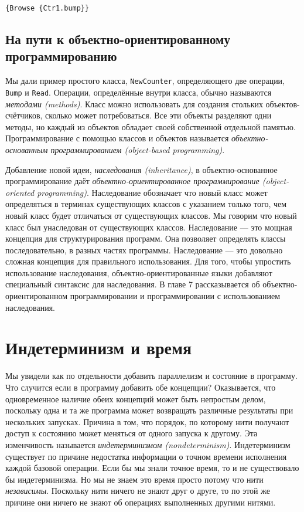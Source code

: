 \begin{lstlisting}
{Browse {Ctr1.bump}}
\end{lstlisting}

\subsection{На пути к объектно-ориентированному программированию}

Мы дали пример простого класса, \lstinline|NewCounter|, определяющего две операции, \lstinline|Bump| и \lstinline|Read|. Операции, определённые внутри класса, обычно называются \emph{методами (methods)}. Класс можно использовать для создания стольких объектов-счётчиков, сколько может потребоваться. Все эти объекты разделяют одни методы, но каждый из объектов обладает своей собственной отдельной памятью. Программирование с помощью классов и объектов называется \emph{объектно-основанным программированием (object-based programming)}.

Добавление новой идеи, \emph{наследования (inheritance)}, в объектно-ос\-но\-ван\-ное программирование даёт \emph{объектно-ориентированное программирование (object-oriented programming)}. Наследование обозначает что новый класс может определяться в терминах существующих классов с указанием только того, чем новый класс будет отличаться от существующих классов. Мы говорим что новый класс был унаследован от существующих классов. Наследование --- это мощная концепция для структурирования программ. Она позволяет определять классы последовательно, в разных частях программы. Наследование --- это довольно сложная концепция для правильного использования. Для того, чтобы упростить использование наследования, объектно-ориентированные языки добавляют специальный синтаксис для наследования. В главе 7 рассказывается об объектно-ориентированном программировании и программировании с использованием наследования.

\section{Индетерминизм и время}

Мы увидели как по отдельности добавить параллелизм и состояние в программу. Что случится если в программу добавить обе концепции? Оказывается, что одновременное наличие обеих концепций может быть непростым делом, поскольку одна и та же программа может возвращать различные результаты при нескольких запусках. Причина в том, что порядок, по которому нити получают доступ к состоянию может меняться от одного запуска к другому. Эта изменчивость называется \emph{индетерминизмом (nondeterminism)}. Индетерминизм существует по причине недостатка информации о точном времени исполнения каждой базовой операции. Если бы мы знали точное время, то и не существовало бы индетерминизма. Но мы не знаем это время просто потому что нити \emph{независимы}. Поскольку нити ничего не знают друг о друге, то по этой же причине они ничего не знают об операциях выполненных другими нитями.

